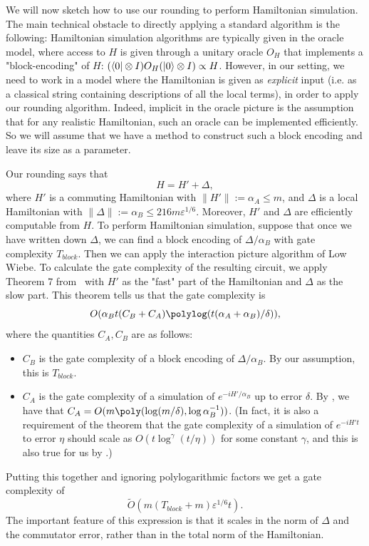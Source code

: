 \documentclass[11pt]{article}
\theoremstyle{plain}
\newcommand{\eps}{\varepsilon}
\begin{document}
We will now sketch how to use our rounding to perform Hamiltonian simulation. The main technical obstacle to directly applying a standard algorithm is the following: Hamiltonian simulation algorithms are typically given in the oracle model, where access to $H$ is given through a unitary oracle $O_H$ that implements a "block-encoding" of $H$: $(\bra{0}\otimes I)O_H (\ket{0} \otimes I) \propto H$. However, in our setting, we need to work in a model where the Hamiltonian is given as \emph{explicit} input (i.e. as a classical string containing descriptions of all the local terms), in order to apply our rounding algorithm. Indeed, implicit in the oracle picture is the assumption that for any realistic Hamiltonian, such an oracle can be implemented efficiently. So we will assume that we have a method to construct such a block encoding and leave its size as a parameter.

    Our rounding says that
    \[ H = H' + \Delta,\]
    where $H'$ is a commuting Hamiltonian with $\|H'\| := \alpha_A \leq m$, and $\Delta$ is a local Hamiltonian with $\|\Delta\| := \alpha_B  \leq 216 m \eps^{1/6}$. Moreover, $H'$ and $\Delta$ are efficiently computable from $H$. To perform Hamiltonian simulation, suppose that once we have written down $\Delta$, we can find a block encoding of $\Delta/\alpha_B$ with gate complexity $T_{block}$. Then we can apply the interaction picture algorithm of Low Wiebe. To calculate the gate complexity of the resulting circuit, we apply Theorem 7 from~\cite{low2018hamiltonian} with $H'$ as the "fast" part of the Hamiltonian and $\Delta$ as the slow part. 
    This theorem tells us that the gate complexity is
    \[O(\alpha_B t(C_B + C_A)\polylog(t(\alpha_A + \alpha_B)/\delta)),\]
    where the quantities $C_A, C_B$ are as follows:
    \begin{itemize}
        \item $C_B$ is the gate complexity of a block encoding of $\Delta/\alpha_B$. By our assumption, this is $T_{block}$. 
        \item $C_A$ is the gate complexity of a simulation of $e^{-iH'/\alpha_B}$ up to error $\delta$. By , we have that $C_A = O(m \poly(\log(m/\delta), \log \alpha_B^{-1}))$. (In fact, it is also a requirement of the theorem that the gate complexity of a simulation of $e^{-iH't}$ to error $\eta$ should scale as $O(t \log^{\gamma}(t/\eta))$ for some constant $\gamma$, and this is also true for us by .) 
    \end{itemize}
    Putting this together and ignoring polylogarithmic factors we get a gate complexity of 
    \[ \tilde{O}(m(T_{block} + m) \eps^{1/6} t).\]
    The important feature of this expression is that it scales in the norm of $\Delta$ and the commutator error, rather than in the total norm of the Hamiltonian.
\printbibliography

\appendix
\end{document}

